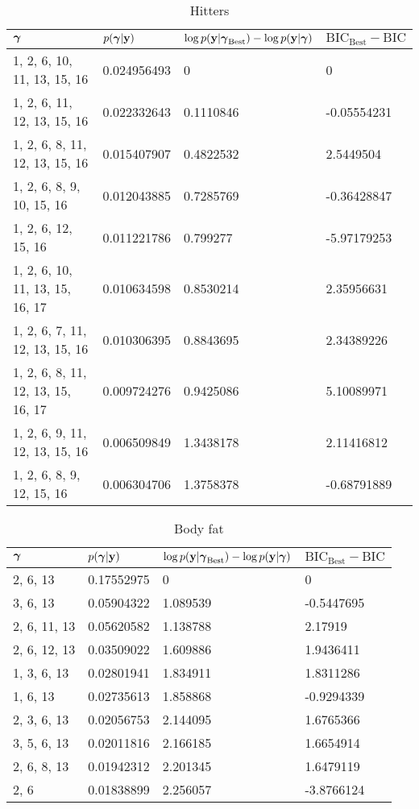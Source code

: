 \documentclass{amsart}
\begin{document}
\begin{table}
\label{tab:numerical_results}
\caption{Hitters}
\begin{tabular}{|l|lll|}
\hline
${\boldsymbol \gamma}$ & $p({\boldsymbol \gamma}|{\bf y})$ & $\log p({\bf y} | {\boldsymbol \gamma}_\text{Best}) - \log p({\bf y} | {\boldsymbol \gamma})$ & $\text{BIC}_\text{Best} - \text{BIC}$ \\
\hline
1, 2, 6, 10, 11, 13, 15, 16 & 0.024956493 & 0 &	0 \\
1, 2, 6, 11, 12, 13, 15, 16 & 0.022332643	& 0.1110846 &	-0.05554231 \\
1, 2, 6, 8, 11, 12, 13, 15, 16 & 0.015407907 & 0.4822532 & 2.5449504 \\
1, 2, 6, 8, 9, 10, 15, 16 & 0.012043885 & 0.7285769 & -0.36428847 \\
1, 2, 6, 12, 15, 16 & 0.011221786 & 0.799277 & -5.97179253 \\
1, 2, 6, 10, 11, 13, 15, 16, 17 & 0.010634598 & 0.8530214 & 2.35956631 \\
1, 2, 6, 7, 11, 12, 13, 15, 16 & 0.010306395 & 0.8843695 & 2.34389226 \\
1, 2, 6, 8, 11, 12, 13, 15, 16, 17 & 0.009724276 & 0.9425086 & 5.10089971 \\
1, 2, 6, 9, 11, 12, 13, 15, 16 & 0.006509849 & 1.3438178 & 2.11416812 \\
1, 2, 6, 8, 9, 12, 15, 16 & 0.006304706 & 1.3758378 & -0.68791889 \\
\hline
\end{tabular}
\end{table}

\begin{table}
\label{tab:numerical_results2}
\caption{Body fat}
\begin{tabular}{|l|lll|}
\hline
${\boldsymbol \gamma}$ & $p({\boldsymbol \gamma}|{\bf y})$ & $\log p({\bf y} | {\boldsymbol \gamma}_\text{Best}) - \log p({\bf y} | {\boldsymbol \gamma})$ & $\text{BIC}_\text{Best} - \text{BIC}$ \\
\hline
2, 6, 13 & 0.17552975 & 0 & 0 \\
3, 6, 13 & 0.05904322 & 1.089539 & -0.5447695 \\
2, 6, 11, 13 & 0.05620582 & 1.138788 & 2.17919 \\
2, 6, 12, 13 & 0.03509022 & 1.609886 & 1.9436411 \\
1, 3, 6, 13 & 0.02801941 & 1.834911 & 1.8311286 \\
1, 6, 13 & 0.02735613 & 1.858868 & -0.9294339 \\
2, 3, 6, 13 & 0.02056753 & 2.144095 & 1.6765366 \\
3, 5, 6, 13 & 0.02011816 & 2.166185 & 1.6654914 \\
2, 6, 8, 13 & 0.01942312 & 2.201345 & 1.6479119 \\
2, 6 & 0.01838899 & 2.256057 & -3.8766124 \\
\hline
\end{tabular}
\end{table}
\end{document}
